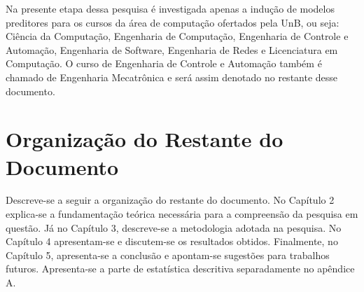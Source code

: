 Na presente etapa dessa pesquisa é investigada apenas a indução de modelos preditores
para os cursos da área de computação ofertados pela UnB, ou seja: Ciência da
Computação, Engenharia de Computação, Engenharia de Controle e Automação, Engenharia
de Software, Engenharia de Redes e Licenciatura em Computação. O curso de Engenharia
de Controle e Automação também é chamado de Engenharia Mecatrônica e será assim
denotado no restante desse documento. 

\section{Organização do Restante do Documento}
\par Descreve-se a seguir a organização do restante do documento. 
No Capítulo 2 explica-se a fundamentação teórica necessária para a compreensão da
pesquisa em questão. Já no Capítulo 3, descreve-se a metodologia
adotada na pesquisa. No Capítulo 4 apresentam-se e discutem-se os resultados
obtidos. Finalmente, no Capítulo 5, apresenta-se a conclusão e apontam-se sugestões para
trabalhos futuros. Apresenta-se a parte de estatística descritiva separadamente no
apêndice A. 
